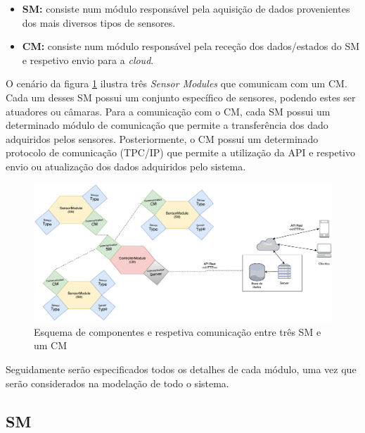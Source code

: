 \begin{itemize}
	\item \textbf{\acl{SM}:} consiste num módulo responsável pela aquisição de dados provenientes dos mais diversos tipos de sensores. 
	
	
	\item \textbf{\acl{CM}:} consiste num módulo responsável pela receção dos dados/estados do \acl{SM} e respetivo envio para a \textit{cloud}.  
	
\end{itemize}


O cenário da figura \ref{esquema1} ilustra três \textit{Sensor Modules} que comunicam com um \acl{CM}. Cada um desses \acl{SM} possui um conjunto específico de sensores, podendo estes ser atuadores ou câmaras. Para a comunicação com o \acl{CM}, cada \acl{SM} possui um determinado módulo de comunicação que permite a transferência dos dado adquiridos pelos sensores. Posteriormente, o \acl{CM} possui um determinado protocolo de comunicação (TPC/IP) que permite a utilização da \ac{API} e respetivo envio ou atualização dos dados adquiridos pelo sistema. 



\begin{figure}[h]
	\centering
	\includegraphics[scale=0.3]{esquemas/general-electronic-modules.pdf}
	\caption{Esquema de componentes e respetiva comunicação entre três \ac{SM} e um \ac{CM}}
	\label{esquema1}
\end{figure}


Seguidamente serão especificados todos os detalhes de cada módulo, uma vez que serão considerados na modelação de todo o sistema. 



\subsection{\acl{SM}}



